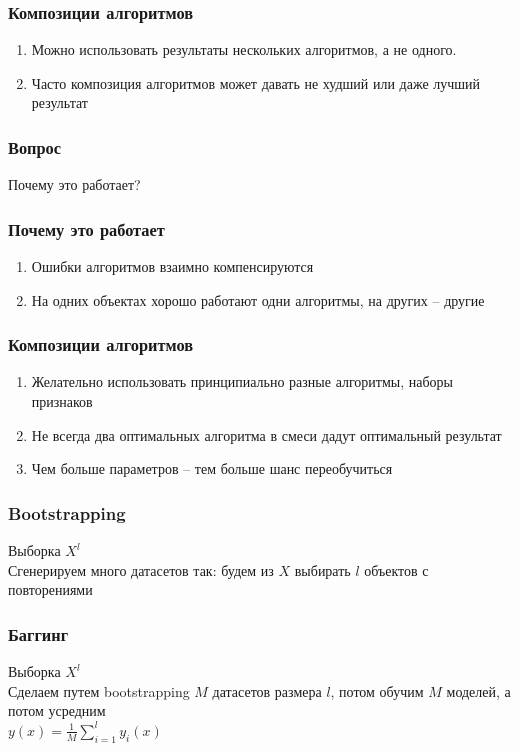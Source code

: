 \documentclass[12pt]{beamer}
\begin{document}
\begin{frame}\frametitle{Композиции алгоритмов}
\begin{enumerate} [--]
\item Можно использовать результаты нескольких	алгоритмов, а не одного.
\item Часто композиция алгоритмов может давать не худший или даже лучший результат
\end{enumerate}
\end{frame}


\begin{frame}\frametitle{Вопрос}
Почему это работает?
\end{frame}

\begin{frame}\frametitle{Почему это работает}
\begin{enumerate} [--]
\item Ошибки	 алгоритмов взаимно компенсируются	
\item На одних объектах хорошо работают одни алгоритмы, на других -- другие	
\end{enumerate}
\end{frame}

\begin{frame}\frametitle{Композиции алгоритмов}
\begin{enumerate} [--]
\item Желательно	 использовать принципиально разные алгоритмы, наборы признаков	
\item Не	 всегда два оптимальных алгоритма в смеси дадут оптимальный результат
\item Чем больше параметров -- тем больше шанс	 переобучиться	
\end{enumerate}
\end{frame}


\begin{frame}\frametitle{Bootstrapping}
Выборка $X^l$\\
\vspace{5mm}
Сгенерируем много датасетов так: будем из $X$ выбирать $l$ объектов с повторениями
\end{frame}

\begin{frame}\frametitle{Баггинг}
Выборка $X^l$\\
\vspace{5mm}
Сделаем путем bootstrapping $M$ датасетов размера $l$, потом обучим $M$ моделей, а потом усредним\\
$y(x) = \frac{1}{M} \sum\limits_{i=1}^l y_i(x)$

\end{frame}
\end{document}
